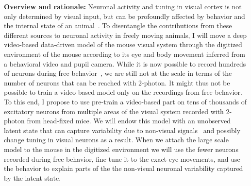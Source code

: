 \documentclass[B2,COG]{ercgrant}
\begin{document}
\textbf{Overview and rationale:} Neuronal activity and tuning in visual cortex is not only determined by visual input, but can be profoundly affected by behavior and the internal state of an animal~\parencite{Niell2010-bs,Musall2019-kd,Stringer2019-lt, Franke2022-do}.
To disentangle the contributions from these different sources to neuronal activity in freely moving animals, I will move a deep video-based data-driven model of the mouse visual system through the digitized environment of the mouse according to its eye and body movement inferred from a behavioral video and pupil camera. 
While it is now possible to record hundreds of neurons during free behavior~\parencite{Parker2022-ac}, we are still not at the scale in terms of the number of neurons that can be reached with 2-photon. 
It might thus not be possible to train a video-based model only on the recordings from free behavior. 
To this end, I propose to use pre-train a video-based part on tens of thousands of excitatory neurons from multiple areas of the visual system recorded with 2-photon from head-fixed mice.
We will endow this model with an unobserved latent state that can capture variability due to non-visual signals~\parencite{Musall2019-kd, Bashiri2021-or} and possibly change tuning in visual neurons as a result.
When we attach the large scale model to the mouse in the digitized environment we will use the fewer neurons recorded during free behavior, fine tune it to the exact eye movements, and use the behavior to explain parts of the the non-visual neuronal variability captured by the latent state.
\end{document}
